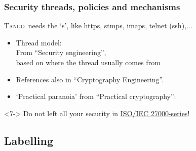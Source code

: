 \documentclass{beamer}
\newcommand{\tango}{\textsc{Tango}}
\begin{document}
\begin{frame}
\frametitle{Security threads, policies and mechanisms}
    \begin{block}{}
        \tango\, needs the `\alert{s}', like http\alert{s}, stmp\alert{s}, imap\alert{s}, telnet (\alert{ssh}),...
    \end{block}
    \begin{itemize}
        \item<2-> Thread model:\\From ``Security engineering''\cite{SecEngRossAnderson},\\based on where the thread usually comes from
        \item<4-> References also in ``Cryptography Engineering''\cite{cryptoEngineering}.
        \item<5-> `Practical paranoia' from ``Practical cryptography''\cite{PractCryptoSchneier}:
    \end{itemize}
    \begin{alertblock}{}<7->
        Do not left all your security in \href{http://en.wikipedia.org/wiki/ISO/IEC_27000-series}{ISO/IEC 27000-series}!
    \end{alertblock}
\end{frame}

\subsection{Labelling}
\end{document}
